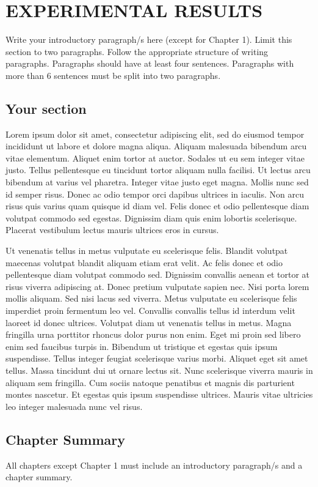 \setlength{\parindent}{0.5in} 
\setlength{\parskip}{0mm}
\setlength{\baselineskip}{1.6em}

\chapter{EXPERIMENTAL RESULTS}
Write your introductory paragraph/s here (except for Chapter 1). Limit this section to two paragraphs. Follow the appropriate structure of writing paragraphs. Paragraphs should have at least four sentences. Paragraphs with more than 6 sentences must be split into two paragraphs.

\section{Your section}
Lorem ipsum dolor sit amet, consectetur adipiscing elit, sed do eiusmod tempor incididunt ut labore et dolore magna aliqua. Aliquam malesuada bibendum arcu vitae elementum. Aliquet enim tortor at auctor. Sodales ut eu sem integer vitae justo. Tellus pellentesque eu tincidunt tortor aliquam nulla facilisi. Ut lectus arcu bibendum at varius vel pharetra. Integer vitae justo eget magna. Mollis nunc sed id semper risus. Donec ac odio tempor orci dapibus ultrices in iaculis. Non arcu risus quis varius quam quisque id diam vel. Felis donec et odio pellentesque diam volutpat commodo sed egestas. Dignissim diam quis enim lobortis scelerisque. Placerat vestibulum lectus mauris ultrices eros in cursus.

Ut venenatis tellus in metus vulputate eu scelerisque felis. Blandit volutpat maecenas volutpat blandit aliquam etiam erat velit. Ac felis donec et odio pellentesque diam volutpat commodo sed. Dignissim convallis aenean et tortor at risus viverra adipiscing at. Donec pretium vulputate sapien nec. Nisi porta lorem mollis aliquam. Sed nisi lacus sed viverra. Metus vulputate eu scelerisque felis imperdiet proin fermentum leo vel. Convallis convallis tellus id interdum velit laoreet id donec ultrices. Volutpat diam ut venenatis tellus in metus. Magna fringilla urna porttitor rhoncus dolor purus non enim. Eget mi proin sed libero enim sed faucibus turpis in. Bibendum ut tristique et egestas quis ipsum suspendisse. Tellus integer feugiat scelerisque varius morbi. Aliquet eget sit amet tellus. Massa tincidunt dui ut ornare lectus sit. Nunc scelerisque viverra mauris in aliquam sem fringilla. Cum sociis natoque penatibus et magnis dis parturient montes nascetur. Et egestas quis ipsum suspendisse ultrices. Mauris vitae ultricies leo integer malesuada nunc vel risus.

\section{Chapter Summary}
All chapters except Chapter 1 must include an introductory paragraph/s and a chapter summary.

\FloatBarrier